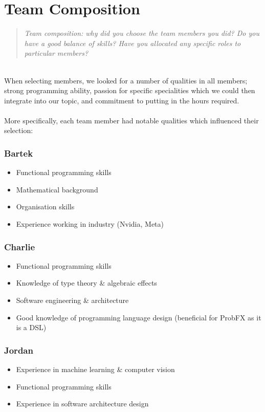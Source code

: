 \documentclass{report}
\newcommand{\teamq}[1]{\begin{quote}
    \large\textit{#1}
\end{quote}}
\begin{document}
\section*{Team Composition}

\teamq{Team composition: why did you choose the team members you did? Do you have a good balance of skills? Have you allocated any specific roles to particular members?}
\\
When selecting members, we looked for a number of qualities in all members; strong programming ability, passion for specific specialities which we could then integrate into our topic, and commitment to putting in the hours required.
\\
\\More specifically, each team member had notable qualities which influenced their selection:
\vspace*{4mm}
\\ \begin{minipage}[t]{.48\textwidth}
\subsubsection*{Bartek}
\begin{itemize}
\setlength\itemsep{0em}
    \item Functional programming skills
    \item Mathematical background
    \item Organisation skills
    \item Experience working in industry (Nvidia, Meta)
\end{itemize}
\subsubsection*{Charlie}
\begin{itemize}
\setlength\itemsep{0em}
    \item Functional programming skills
    \item Knowledge of type theory \& algebraic effects
    \item Software engineering \& architecture
    \item Good knowledge of programming language design (beneficial for ProbFX as it is a DSL)
\end{itemize}
\subsubsection*{Jordan}
\begin{itemize}
\setlength\itemsep{0em}
    \item Experience in machine learning \& computer vision
    \item Functional programming skills
    \item Experience in software architecture design
\end{itemize}
\end{minipage}
\end{document}
